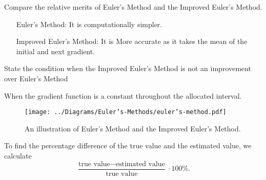 \documentclass[oneside]{book}
\begin{document}
\begin{note}{}{}
  Compare the relative merits of Euler's Method and the Improved Euler's Method.
  \begin{enumerate}[wide=0pt, leftmargin=*]
    \item[Euler's Method:] It is computationally simpler.
    \item[Improved Euler's Method:] It is More accurate as it takes the mean of the initial and next gradient. 
  \end{enumerate}
\end{note}
\begin{note}
  State the condition when the Improved Euler's Method is not an improvement over Euler's Method
  \begin{center}
    When the gradient function is a constant throughout the allocated interval.
  \end{center} 
\end{note}
\begin{figure}[H]
  \centering
  \texttt{[image: ../Diagrams/Euler's-Methods/euler's-method.pdf]}
  \caption{An illustration of \textcolor{green!50!blue}{Euler's Method} and the \textcolor{green!85!black}{Improved Euler's Method}.}
  \label{fig:euler's-methods}
\end{figure}
\begin{note}
  To find the percentage difference of the true value and the estimated value, we calculate
  \[\frac{\text{true value}-\text{estimated value}}{\text{true value}}\cdot 100\%.\]
\end{note}
\end{document}

